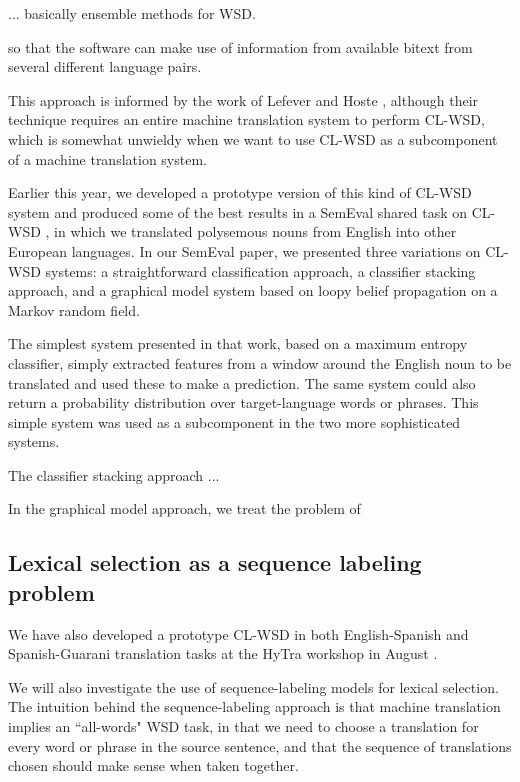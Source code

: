 ... basically ensemble methods for WSD.





so that the software can make use of information from
available bitext from several different language pairs.

This approach is informed by the work of Lefever and Hoste
\cite{lefever-hoste-decock:2011:ACL-HLT2011}, although their technique requires
an entire machine translation system to perform CL-WSD, which is somewhat
unwieldy when we want to use CL-WSD as a subcomponent of a machine translation
system.


Earlier this year, we developed a prototype version of this kind of CL-WSD
system \cite{rudnick-liu-gasser:2013:SemEval-2013} and produced some of the
best results in a SemEval shared task on CL-WSD \cite{task10}, in which we
translated polysemous nouns from English into other European languages. In our
SemEval paper, we presented three variations on CL-WSD systems: a
straightforward classification approach, a classifier stacking approach, and a
graphical model system based on loopy belief propagation on a Markov random
field.

The simplest system presented in that work, based on a maximum entropy
classifier, simply extracted features from a window around the English noun to
be translated and used these to make a prediction. The same system could also
return a probability distribution over target-language words or phrases. This
simple system was used as a subcomponent in the two more sophisticated systems.


The classifier stacking approach ...


In the graphical model approach, we treat the problem of 


\subsection{Lexical selection as a sequence labeling problem}

We have also developed a prototype
CL-WSD in both English-Spanish and Spanish-Guarani translation tasks at the
HyTra workshop in August \cite{rudnick-gasser:2013:HyTra-2013}.

We will also investigate the use of sequence-labeling models for
lexical selection.  The intuition behind the sequence-labeling approach is that
machine translation implies an ``all-words" WSD task, in that we need to choose
a translation for every word or phrase in the source sentence, and that the
sequence of translations chosen should make sense when taken together.

